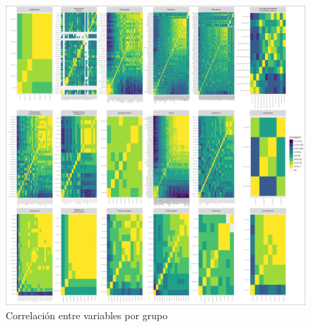 \documentclass{article}
\begin{document}
\begin{figure}[H]
  \centering  
  \includegraphics[width=1\textwidth]{6_correlacion.png}
  \caption{Correlación entre variables por grupo\label{fig:correlacion_tot}}
\end{figure}

\printbibliography
\end{document}
